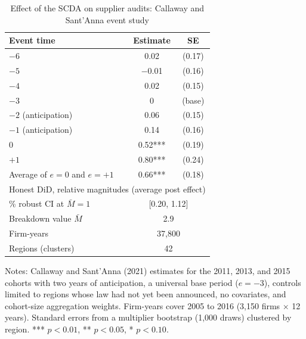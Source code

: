 \documentclass[11pt]{article}
\begin{document}
\begin{table}[ht]
\centering
\begin{threeparttable}
\caption{Effect of the SCDA on supplier audits: Callaway and Sant'Anna event study}
\label{tab:audit}
\small
\begin{tabular}{lcc}
\toprule
Event time & Estimate & SE \\
\midrule
$-6$ & 0.02 & (0.17) \\
$-5$ & $-$0.01 & (0.16) \\
$-4$ & 0.02 & (0.15) \\
$-3$ & 0 & (base) \\
$-2$ (anticipation) & 0.06 & (0.15) \\
$-1$ (anticipation) & 0.14 & (0.16) \\
$0$ & 0.52*** & (0.19) \\
$+1$ & 0.80*** & (0.24) \\
\midrule
Average of $e = 0$ and $e = +1$ & 0.66*** & (0.18) \\
\midrule
\multicolumn{3}{l}{Honest DiD, relative magnitudes (average post effect)} \\
\quad 95\% robust CI at $\bar{M} = 1$ & \multicolumn{2}{c}{[0.20, 1.12]} \\
\quad Breakdown value $\bar{M}$ & \multicolumn{2}{c}{2.9} \\
\midrule
Firm-years & \multicolumn{2}{c}{37,800} \\
Regions (clusters) & \multicolumn{2}{c}{42} \\
\bottomrule
\end{tabular}
\begin{tablenotes}\footnotesize
\item Notes: Callaway and Sant'Anna (2021) estimates for the 2011, 2013, and 2015 cohorts with two years of anticipation, a universal base period ($e = -3$), controls limited to regions whose law had not yet been announced, no covariates, and cohort-size aggregation weights. Firm-years cover 2005 to 2016 (3,150 firms $\times$ 12 years). Standard errors from a multiplier bootstrap (1,000 draws) clustered by region. *** $p<0.01$, ** $p<0.05$, * $p<0.10$.
\end{tablenotes}
\end{threeparttable}
\end{table}
\end{document}
